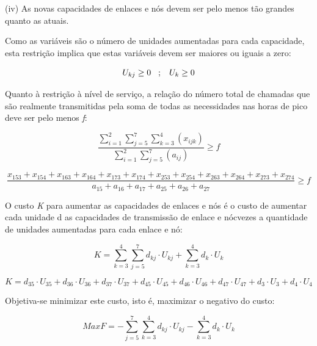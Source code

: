 \documentclass{article}
\begin{document}
(iv) As novas capacidades de enlaces e nós devem ser
pelo menos tão grandes quanto as atuais.

Como as variáveis são o número de unidades aumentadas para cada capacidade, esta restrição implica que estas variáveis devem ser maiores ou iguais a zero:

\begin{equation*}
U_{kj} \geq 0 \hspace{0.3cm} ; \hspace{0.3cm} U_{k} \geq 0
\end{equation*}

Quanto à restrição à nível de serviço, a relação do número total de chamadas que são realmente transmitidas pela soma de todas as necessidades nas horas de pico deve ser pelo menos \textit{f}:

\begin{equation*}
    \frac{\sum_{i=1}^{2}\sum_{j=5}^{7}\sum_{k=3}^{4}(x_{ijk})}{\sum_{i=1}^{2}\sum_{j=5}^{7}(a_{ij})} \geq f
\end{equation*}

\begin{equation*}
    \frac{x_{153} + x_{154} + x_{163} + x_{164} + x_{173} + x_{174} + x_{253} + x_{254} + x_{263} + x_{264} + x_{273} + x_{274}}{a_{15} + a_{16} + a_{17} + a_{25} + a_{26} + a_{27}} \geq f
\end{equation*}

O custo \textit{K} para aumentar as capacidades de enlaces e nós é o custo de aumentar cada unidade d as capacidades de transmissão de enlace e nócvezes a quantidade de unidades aumentadas para cada enlace e nó:

\begin{equation*}
    K = \sum_{k=3}^{4}\sum_{j=5}^{7} d_{kj}\cdot U_{kj} + \sum_{k=3}^{4} d_{k}\cdot U_{k}
\end{equation*}

\begin{equation*}
    K = d_{35}\cdot U_{35} + d_{36}\cdot U_{36} + d_{37}\cdot U_{37} + d_{45}\cdot U_{45} + d_{46}\cdot U_{46} + d_{47}\cdot U_{47} + d_{3}\cdot U_{3} + d_{4}\cdot U_{4}
\end{equation*}

Objetiva-se minimizar este custo, isto é, maximizar o negativo do custo:

\begin{equation*}
   Max F = -\sum_{j=5}^{7}\sum_{k=3}^{4} d_{kj}\cdot U_{kj} - \sum_{k=3}^{4} d_{k}\cdot U_{k}
\end{equation*}
\end{document}
